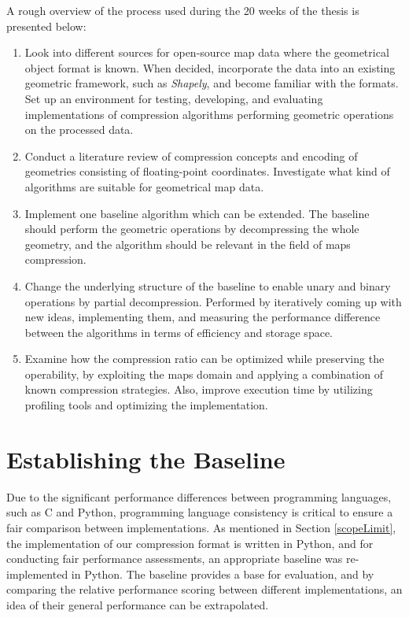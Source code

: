 A rough overview of the process used during the 20 weeks of the thesis is presented below:
\begin{enumerate}

  \item Look into different sources for open-source map data where the geometrical object format is known. When decided, incorporate the data into an existing geometric framework, such as \emph{Shapely}, and become familiar with the formats. Set up an environment for testing, developing, and evaluating implementations of compression algorithms performing geometric operations on the processed data.
    
  \item Conduct a literature review of compression concepts and encoding of geometries consisting of floating-point coordinates. Investigate what kind of algorithms are suitable for geometrical map data.

  \item Implement one baseline algorithm which can be extended. The baseline should perform the geometric operations by decompressing the whole geometry, and the algorithm should be relevant in the field of maps compression.
  
  \item Change the underlying structure of the baseline to enable unary and binary operations by partial decompression. Performed by iteratively coming up with new ideas, implementing them, and measuring the performance difference between the algorithms in terms of efficiency and storage space.

  \item Examine how the compression ratio can be optimized while preserving the operability, by exploiting the maps domain and applying a combination of known compression strategies. Also, improve execution time by utilizing profiling tools and optimizing the implementation.


\end{enumerate}


\section{Establishing the Baseline}
Due to the significant performance differences between programming languages, such as C and Python, programming language consistency is critical to ensure a fair comparison between implementations. As mentioned in Section \ref{scopeLimit},  the implementation of our compression format is written in Python, and for conducting fair performance assessments, an appropriate baseline was re-implemented in Python. The baseline provides a base for evaluation, and by comparing the relative performance scoring between different implementations, an idea of their general performance can be extrapolated. 


